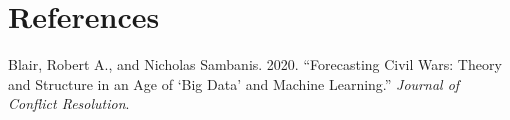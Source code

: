 \documentclass[]{article}
\begin{document}
\hypertarget{references}{%
\section*{References}\label{references}}

\hypertarget{refs}{}
\leavevmode\hypertarget{ref-blair2020forecasting}{}%
Blair, Robert A., and Nicholas Sambanis. 2020. ``Forecasting Civil Wars:
Theory and Structure in an Age of `Big Data' and Machine Learning.''
\emph{Journal of Conflict Resolution}.
\end{document}
